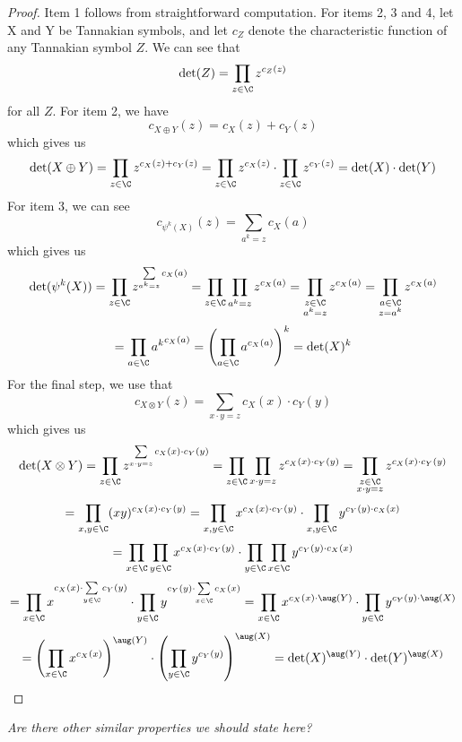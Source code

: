 \documentclass[a4paper]{article}
\begin{document}
\begin{proof}
Item 1 follows from straightforward computation. For items 2, 3 and 4, let X and Y be Tannakian symbols, and let $c_Z$ denote the characteristic function of any Tannakian symbol $Z$. We can see that 
$$\det(Z) = \prod_{z \in \C} z^{c_Z(z)}$$
for all $Z$. For item 2, we have 
$$c_{X \oplus Y}(z) = c_X(z) + c_Y(z)$$
which gives us
$$\det(X \oplus Y) = \prod_{z \in \C} z^{c_X(z) + c_Y(z)} = \prod_{z \in \C} z^{c_X(z)} \cdot \prod_{z \in \C} z^{c_Y(z)} = \det(X) \cdot \det(Y)$$
For item 3, we can see
$$c_{\psi^k(X)}(z) = \sum_{a^k = z} c_{X}(a)$$
which gives us
$$\det(\psi^k(X)) = \prod_{z \in \C} z^{\sum\limits_{a^k = z} c_{X}(a)} = \prod_{z \in \C} \prod_{a^k = z} z^{c_{X}(a)} = \prod_{\substack{z \in \C \\ a^k = z}} z^{c_{X}(a)} = \prod_{\substack{a \in \C \\ z = a^k}} z^{c_{X}(a)}$$
$$= \prod_{\substack{a \in \C}} {a^k}^{c_{X}(a)} = \left(\prod_{\substack{a \in \C}} a^{c_{X}(a)}\right)^k = \det(X)^k$$
For the final step, we use that 
$$c_{X \otimes Y}(z) = \sum_{x \cdot y=z} c_X(x) \cdot c_Y(y)$$
which gives us
$$\det(X \otimes Y) = \prod_{z \in \C} z^{\sum\limits_{x \cdot y=z} c_X(x) \cdot c_Y(y)} = \prod_{z \in \C} \prod_{x \cdot y=z} z^{ c_X(x) \cdot c_Y(y)} = \prod_{\substack{z \in \C \\ x \cdot y=z}}  z^{ c_X(x) \cdot c_Y(y)}$$
$$ = \prod_{\substack{x, y \in \C}} (xy)^{ c_X(x) \cdot c_Y(y)} = \prod_{\substack{x, y \in \C}} x^{ c_X(x) \cdot c_Y(y)} \cdot \prod_{\substack{x, y \in \C}} y^{ c_Y(y) \cdot c_X(x) }$$
$$= \prod_{\substack{x \in \C}} \prod_{\substack{y \in \C}}x^{ c_X(x) \cdot c_Y(y)} \cdot \prod_{\substack{y \in \C}} \prod_{\substack{x \in \C}} y^{ c_Y(y) \cdot c_X(x)}$$
$$= \prod_{x \in \C} x^{ c_X(x) \cdot \sum\limits_{y \in \C} c_Y(y)} \cdot \prod_{y \in \C} y^{ c_Y(y) \cdot \sum\limits_{x \in \C} c_X(x)}= \prod_{x \in \C} x^{ c_X(x) \cdot \aug(Y)} \cdot \prod_{y \in \C} y^{ c_Y(y) \cdot \aug(X)}$$
$$= \left(\prod_{x \in \C} x^{ c_X(x)} \right)^{\aug(Y)} \cdot \left(\prod_{y \in \C} y^{ c_Y(y)} \right)^{\aug(X)} = \det(X)^{\aug(Y)} \cdot \det(Y)^{\aug(X)}$$

\end{proof}

\emph{Are there other similar properties we should state here?} %
\end{document}
